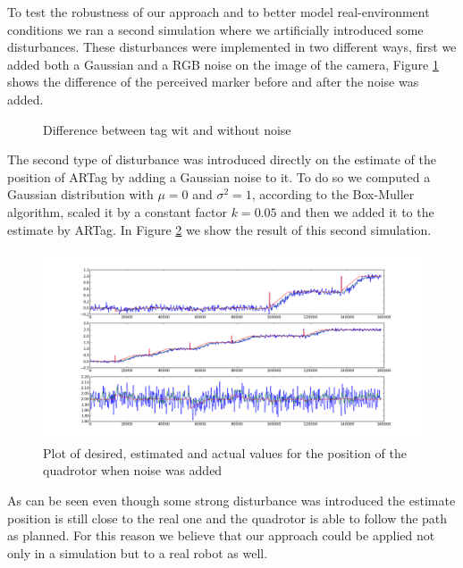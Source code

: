 To test the robustness of our approach and to better model real-environment conditions we ran a second simulation where we artificially introduced some disturbances. These disturbances were implemented in two different ways, first we added both a Gaussian and a RGB noise on the image of the camera, Figure \ref{fig:artag} shows the difference of the perceived marker before and after the noise was added.

 \begin{figure}[!h]
 \centering
 \hspace{5mm}
 \caption{Difference between tag wit and without noise}
 \label{fig:artag}
 \end{figure}
 

The second type of disturbance was introduced directly on the estimate of the position of ARTag by adding a Gaussian noise to it. To do so we computed a Gaussian distribution with $\mu=0$ and $\sigma^2=1$, according to the Box-Muller algorithm, scaled it by a constant factor $k=0.05$ and then we added it to the estimate by ARTag. In Figure \ref{fig:plot_noise} we show the result of this second simulation.

\begin{figure}[h!]
  \centering
    \includegraphics[scale=0.35]{figs/plot_noise.png}
  \caption{Plot of desired, estimated and actual values for the position of the quadrotor when noise was added}
  \label{fig:plot_noise}
\end{figure}


As can be seen even though some strong disturbance was introduced the estimate position is still close to the real one and the quadrotor is able to follow the path as planned. For this reason we believe that our approach could be applied not only in a simulation but to a real robot as well.